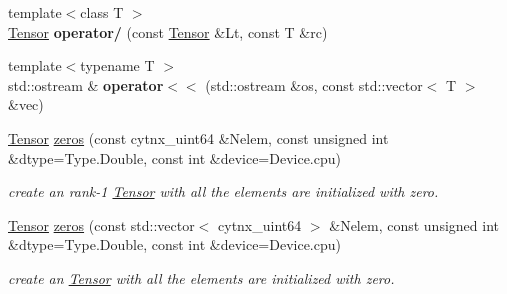 \begin{DoxyCompactItemize}
\item 
\mbox{\label{namespacecytnx_aa0d1098af300b504134953d480d0f780}} 
{\footnotesize template$<$class T $>$ }\\\hyperlink{classcytnx_1_1Tensor}{Tensor} {\bfseries operator/} (const \hyperlink{classcytnx_1_1Tensor}{Tensor} \&Lt, const T \&rc)
\item 
\mbox{\label{namespacecytnx_ab079a9e930c0508a63311bc8624c498f}} 
{\footnotesize template$<$typename T $>$ }\\std\+::ostream \& {\bfseries operator$<$$<$} (std\+::ostream \&os, const std\+::vector$<$ T $>$ \&vec)
\end{DoxyCompactItemize}
\textbf{ }\par
\begin{DoxyCompactItemize}
\item 
\hyperlink{classcytnx_1_1Tensor}{Tensor} \hyperlink{namespacecytnx_ab8a79a03fb0465f3eb2641017f3f1755}{zeros} (const cytnx\+\_\+uint64 \&Nelem, const unsigned int \&dtype=Type.\+Double, const int \&device=Device.\+cpu)
\begin{DoxyCompactList}\small\item\em create an rank-\/1 \hyperlink{classcytnx_1_1Tensor}{Tensor} with all the elements are initialized with zero. \end{DoxyCompactList}\item 
\hyperlink{classcytnx_1_1Tensor}{Tensor} \hyperlink{namespacecytnx_ad53947bd87534866b11080f9898d2a53}{zeros} (const std\+::vector$<$ cytnx\+\_\+uint64 $>$ \&Nelem, const unsigned int \&dtype=Type.\+Double, const int \&device=Device.\+cpu)
\begin{DoxyCompactList}\small\item\em create an \hyperlink{classcytnx_1_1Tensor}{Tensor} with all the elements are initialized with zero. \end{DoxyCompactList}\end{DoxyCompactItemize}

